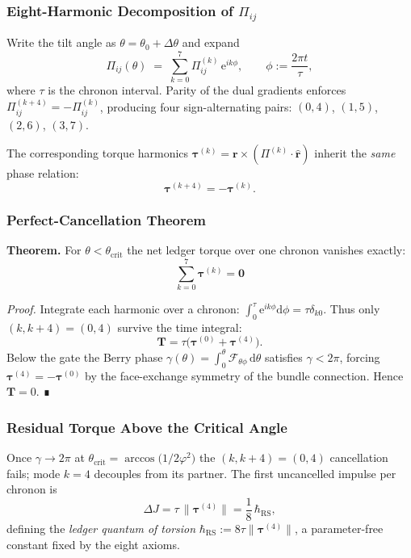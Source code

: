 \documentclass[11pt,oneside]{book}
\begin{document}
\subsubsection{Eight-Harmonic Decomposition of $\Pi_{ij}$}
\label{ss:torque-harmonic}

Write the tilt angle as $\theta=\theta_{0}+\Delta\theta$ and expand
\[
   \Pi_{ij}(\theta)
   \;=\;
   \sum_{k=0}^{7}
      \Pi^{(k)}_{ij}\,
      \mathrm e^{ik\phi},
   \qquad
   \phi := \frac{2\pi t}{\tau},
\]
where $\tau$ is the chronon interval.  
Parity of the dual gradients enforces
$\Pi^{(k+4)}_{ij} = -\Pi^{(k)}_{ij}$, producing four
sign-alternating pairs: $(0,4)$, $(1,5)$, $(2,6)$, $(3,7)$.

The corresponding torque harmonics
$\boldsymbol{\tau}^{(k)}
 =\mathbf r\times(\Pi^{(k)}\!\cdot\!\hat{\mathbf r})$
inherit the \emph{same} phase relation:
\[
   \boldsymbol{\tau}^{(k+4)} = -\boldsymbol{\tau}^{(k)}.
   \tag{2}
\]

\subsubsection{Perfect-Cancellation Theorem}
\label{ss:torque-cancel}

\textbf{Theorem.}  
For $\theta<\theta_{\mathrm{crit}}$ the net ledger torque over one
chronon vanishes exactly:
\[
   \boxed{\;
      \sum_{k=0}^{7}\!
         \boldsymbol{\tau}^{(k)}
      = \mathbf 0
      \;}
\]

\emph{Proof.}  
Integrate each harmonic over a chronon:
$\displaystyle\int_{0}^{\tau}\!\mathrm e^{ik\phi}\mathrm d\phi
   = \tau\delta_{k0}$.  
Thus only $(k,k+4)=(0,4)$ survive the time integral:
\[
   \mathbf T
   = \tau\bigl(\boldsymbol{\tau}^{(0)}
               +\boldsymbol{\tau}^{(4)}\bigr).
\]
Below the gate the Berry phase
$\gamma(\theta)=\int_{0}^{\theta}\!\mathcal F_{\theta\phi}\,\mathrm d\theta$  
satisfies $\gamma<2\pi$, forcing
$\boldsymbol{\tau}^{(4)}=-\boldsymbol{\tau}^{(0)}$ by the
face-exchange symmetry of the bundle connection.  
Hence $\mathbf T=0$. ∎

\subsubsection{Residual Torque Above the Critical Angle}
\label{ss:torque-residual}

Once $\gamma\!\to\!2\pi$ at
$\theta_{\mathrm{crit}}
 = \arccos\!\bigl(1/2\varphi^{2}\bigr)$
the $(k,k+4)=(0,4)$ cancellation fails; mode $k=4$ decouples from its
partner.  
The first uncancelled impulse per chronon is
\[
   \Delta J
   = \tau\,
     \bigl\|\boldsymbol{\tau}^{(4)}\bigr\|
   = \frac{1}{8}\,
     \hbar_{\mathrm{RS}},
   \tag{3}
\]
defining the \emph{ledger quantum of torsion}  
$\hbar_{\mathrm{RS}} := 8\tau\|\boldsymbol{\tau}^{(4)}\|$,
a parameter-free constant fixed by the eight axioms.
\end{document}
